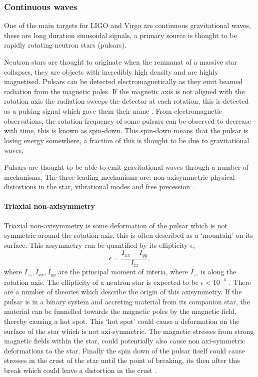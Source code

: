 \subsubsection{Continuous waves}


One of the main targets for \ac{LIGO} and Virgo are continuous gravitational waves, these are long duration sinusoidal signals, a primary source is thought to be rapidly rotating neutron stars (pulsars). 

Neutron stars are thought to originate when the remnanat of a massive star collapses, they are objects with incredibly high density and are highly magnetised.
Pulsars can be detected electromagnetically as they emit beamed radiation from the magnetic poles.
If the magnetic axis is not aligned with the rotation axis the radiation sweeps the detector at each rotation, this is detected as a pulsing signal which gave them their name \cite{lyne_graham-smith_2012}.
From electromagnetic observations, the rotation frequency of some pulsars can be observed to decrease with time, this is known as spin-down.
This spin-down means that the pulsar is losing energy somewhere, a fraction of this is thought to be due to gravitational waves. 

Pulsars are thought to be able to emit gravitational waves through a number of mechanisms. The three leading mechanisms are: non-axisymmetric physical distortions in the star, vibrational modes and free precession \cite{Becker2009}.

\paragraph{Triaxial non-axisymmetry}

Triaxial non-axisymmetry is some deformation of the pulsar which is not symmetric around the rotation axis, this is often described as a `mountain' on its surface.
This assymmetry can be quantified by its ellipticity $\epsilon$,
\begin{equation}
\label{ellipticity}
\epsilon = \frac{I_{xx}-I_{yy}}{I_{zz}},
\end{equation}
where $I_{zz},I_{xx},I_{yy}$ are the principal moment of interia, where $I_{zz}$ is along the rotation axis. 
The ellipticity of a neutron star is expected to be $ \epsilon<10^{-5}$ \cite{Becker2009}. 
There are a number of theories which describe the origin of this axisymmetry.
If the pulsar is in a binary system and accreting material from its companion star, the material can be funnelled towards the magnetic poles by the magnetic field, thereby causing a hot spot.
This `hot spot' could cause a deformation on the surface of the star which is not axi-symmetric. 
The magnetic stresses from strong magnetic fields within the star, could potentially also cause non axi-symmetric deformations to the star.
Finally the spin down of the pulsar itself could cause stresses in the crust of the star until the point of breaking, its then after this break which could leave a distortion in the crust \cite{Becker2009}.

